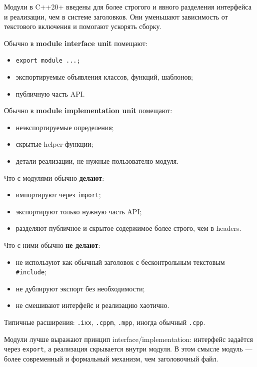 Модули в C++20+ введены для более строгого и явного разделения интерфейса и реализации, чем в системе заголовков. Они уменьшают зависимость от текстового включения и помогают ускорять сборку.

Обычно в \textbf{module interface unit} помещают:
\begin{itemize}
    \item \texttt{export module ...;}
    \item экспортируемые объявления классов, функций, шаблонов;
    \item публичную часть API.
\end{itemize}

Обычно в \textbf{module implementation unit} помещают:
\begin{itemize}
    \item неэкспортируемые определения;
    \item скрытые helper-функции;
    \item детали реализации, не нужные пользователю модуля.
\end{itemize}

Что с модулями обычно \textbf{делают}:
\begin{itemize}
    \item импортируют через \texttt{import};
    \item экспортируют только нужную часть API;
    \item разделяют публичное и скрытое содержимое более строго, чем в headers.
\end{itemize}

Что с ними обычно \textbf{не делают}:
\begin{itemize}
    \item не используют как обычный заголовок с бесконтрольным текстовым \texttt{\#include};
    \item не дублируют экспорт без необходимости;
    \item не смешивают интерфейс и реализацию хаотично.
\end{itemize}

Типичные расширения: \texttt{.ixx}, \texttt{.cppm}, \texttt{.mpp}, иногда обычный \texttt{.cpp}.

\begin{remark}
Модули лучше выражают принцип interface/implementation: интерфейс задаётся через \texttt{export}, а реализация скрывается внутри модуля. В этом смысле модуль — более современный и формальный механизм, чем заголовочный файл.
\end{remark}
